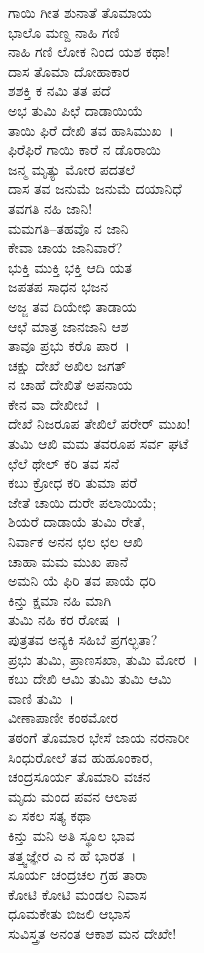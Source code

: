 ಗಾಯಿ ಗೀತ ಶುನಾತೆ ತೊಮಾಯ\\ಭಾಲೊ ಮಣ್ದ ನಾಹಿ ಗಣಿ\\ನಾಹಿ ಗಣಿ ಲೋಕ ನಿಂದ ಯಶ ಕಥಾ!\\ದಾಸ ತೊಮಾ ದೋಹಾಕಾರ\\ಶಶಕ್ತಿ ಕ ನಮಿ ತತ ಪದೆ\\ಅಭ ತುಮಿ ಪಿಛೆ ದಾಡಾಯಿಯೆ\\ತಾಯಿ ಫಿರೆ ದೇಖಿ ತವ ಹಾಸಿಮುಖ~।\\ಫಿರೆಫಿರೆ ಗಾಯಿ ಕಾರೆ ನ ಡೊರಾಯಿ\\ಜನ್ಮ ಮೃತ್ಯು ಮೋರ ಪದತಲೆ\\ದಾಸ ತವ ಜನುಮೆ ಜನುಮೆ ದಯಾನಿಧೆ\\ತವಗತಿ ನಹಿ ಜಾನಿ!\\ಮಮಗತಿ–ತಹವೊ ನ ಜಾನಿ\\ಕೇವಾ ಚಾಯ ಜಾನಿವಾರೆ?\\ಭುಕ್ತಿ ಮುಕ್ತಿ ಭಕ್ತಿ ಆದಿ ಯತ\\ಜಪತಪ ಸಾಧನ ಭಜನ\\ಅಜ್ಜ ತವ ದಿಯೇಛಿ ತಾಡಾಯ\\ಆಛೆ ಮಾತ್ರ ಜಾನಜಾನಿ ಆಶ\\ತಾವೂ ಪ್ರಭು ಕರೊ ಪಾರ~।\\ಚಕ್ಷು ದೇಖೆ ಅಖಿಲ ಜಗತ್\\ನ ಚಾಹೆ ದೇಖಿತೆ ಅಪನಾಯ\\ಕೇನ ವಾ ದೇಖೀಬೆ~।\\ದೇಖೆ ನಿಜರೂಪ ತೇಖಿಲೆ ಪರೇರ್ ಮುಖ!\\ತುಮಿ ಆಖಿ ಮಮ ತವರೂಪ ಸರ್ವ ಘಟೆ\\ಛೆಲೆ ಥೇಲ್ ಕರಿ ತವ ಸನೆ\\ಕಬು ಕ್ರೋಧ ಕರಿ ತುಮಾ ಪರೆ\\ಜೇತೆ ಚಾಯಿ ದುರೇ ಪಲಾಯಿಯೆ;\\ಶಿಯರೆ ದಾಡಾಯೆ ತುಮಿ ರೇತೆ,\\ನಿರ್ವಾಕ ಅನನ ಛಲ ಛಲ ಆಖಿ\\ಚಾಹಾ ಮಮ ಮುಖ ಪಾನೆ\\ಅಮನಿ ಯೆ ಫಿರಿ ತವ ಪಾಯೆ ಧರಿ\\ಕಿನ್ತು ಕ್ಷಮಾ ನಹಿ ಮಾಗಿ\\ತುಮಿ ನಹಿ ಕರ ರೋಷ~।\\ಪುತ್ರತವ ಅನ್ಯಕಿ ಸಹಿಬೆ ಪ್ರಗಲ್ಭತಾ?\\ಪ್ರಭು ತುಮಿ, ಪ್ರಾಣಸಖಾ, ತುಮಿ ಮೋರ~।\\ಕಬು ದೇಖಿ ಆಮಿ ತುಮಿ ತುಮಿ ಆಮಿ\\ವಾಣಿ ತುಮಿ~।\\ವೀಣಾಪಾಣೀ ಕಂಠಮೋರ\\ತಠಂಗೆ ತೊಮಾರ ಭೇಸೆ ಜಾಯ ನರನಾರೀ\\ಸಿಂಧುರೋಲೆ ತವ ಹುಹೂಂಕಾರ,\\ಚಂದ್ರಸೂರ್ಯ ತೊಮಾರಿ ವಚನ\\ಮೃದು ಮಂದ ಪವನ ಆಲಾಪ\\ಏ ಸಕಲ ಸತ್ಯ ಕಥಾ\\ಕಿನ್ತು ಮನಿ ಅತಿ ಸ್ಥೂಲ ಭಾವ\\ತತ್ತ್ವಜ್ಞೇರ ಎ ನ ಹೆ ಭಾರತ~।\\ಸೂರ್ಯ ಚಂದ್ರಚಲ ಗ್ರಹ ತಾರಾ\\ಕೋಟಿ ಕೋಟಿ ಮಂಡಲ ನಿವಾಸ\\ಧೂಮಕೇತು ಬಿಜಲಿ ಆಭಾಸ\\ಸುವಿಸ್ತ್ರತ ಅನಂತ ಆಕಾಶ ಮನ ದೇಖೇ!\\
